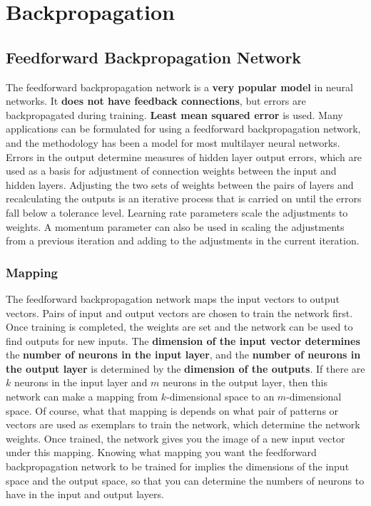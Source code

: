 \chapter{Backpropagation}

\section{Feedforward Backpropagation Network}
The feedforward backpropagation network is a \textbf{very popular model} in neural
networks. It \textbf{does not have feedback connections}, but errors are
backpropagated during training. \textbf{Least mean squared error} is used. Many
applications can be formulated for using a feedforward backpropagation
network, and the methodology has been a model for most multilayer neural
networks. Errors in the output determine measures of hidden layer output
errors, which are used as a basis for adjustment of connection weights between
the input and hidden layers. Adjusting the two sets of weights between the
pairs of layers and recalculating the outputs is an iterative process that is
carried on until the errors fall below a tolerance level. Learning rate
parameters scale the adjustments to weights. A momentum parameter can also
be used in scaling the adjustments from a previous iteration and adding to the
adjustments in the current iteration.

\subsection{Mapping}
The feedforward backpropagation network maps the input vectors to output
vectors. Pairs of input and output vectors are chosen to train the network first.
Once training is completed, the weights are set and the network can be used to
find outputs for new inputs. The \textbf{dimension of the input vector determines} the
\textbf{number of neurons in the input layer}, and the \textbf{number of neurons in the output
layer} is determined by the \textbf{dimension of the outputs}. If there are $k$ neurons in
the input layer and $m$ neurons in the output layer, then this network can make a
mapping from $k$-dimensional space to an $m$-dimensional space. Of course,
what that mapping is depends on what pair of patterns or vectors are used as 
exemplars to train the network, which determine the network weights. Once
trained, the network gives you the image of a new input vector under this
mapping. Knowing what mapping you want the feedforward backpropagation
network to be trained for implies the dimensions of the input space and the
output space, so that you can determine the numbers of neurons to have in the
input and output layers.

